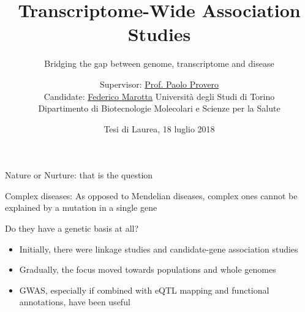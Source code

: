 \documentclass[aspectratio=169,12pt]{beamer}
\title{Transcriptome-Wide Association Studies}
\subtitle{\small Bridging the gap between genome, transcriptome and 
disease}
\author[Federico Marotta]
{
	\footnotesize
	Supervisor: \href{mailto:paolo.provero@unito.it}{Prof. Paolo 
		Provero}
	\\
	Candidate: \href{mailto:federico.marotta@edu.unito.it}{Federico 
		Marotta}
	\vfill
	\scriptsize
	Università degli Studi di Torino
	\\
	Dipartimento di Biotecnologie Molecolari e Scienze per la Salute
	\vfill
}
\institute[UniTo, DBMSS]
{



}
\date{\tiny Tesi di Laurea, 18 luglio 2018}
\begin{document}
\maketitle


\begin{frame}{Nature or Nurture: that is the question}

	\bigskip

	\begin{block}{Complex diseases:}
		As opposed to Mendelian diseases, complex ones cannot be 
explained by a mutation in a single gene
	\end{block}

	\bigskip

	Do they have a genetic basis at all?

	\pause

	\begin{itemize}
		\item Initially, there were \alert{linkage studies} and 
\alert{candidate-gene association studies}
		\item Gradually, the focus moved towards \alert{populations and 
whole genomes}
		\item \alert{GWAS}, especially if combined with eQTL mapping and 
functional annotations, have been useful
	 \end{itemize}


\end{frame}




\end{document}
